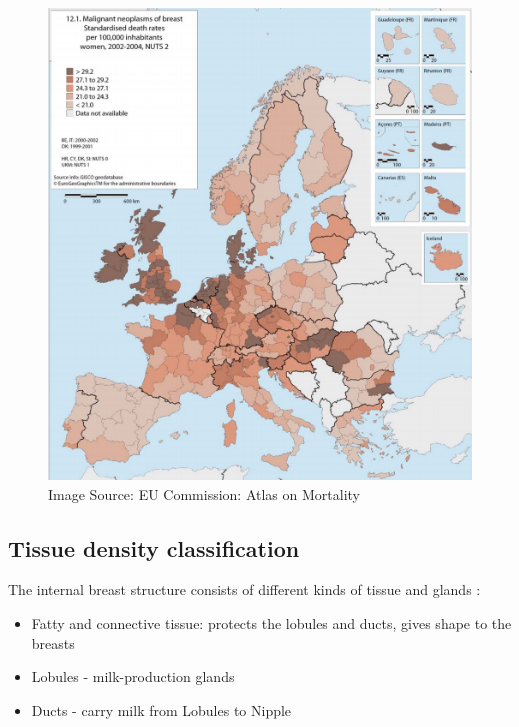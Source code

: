 \begin{figure}[!h]
  \center
  \includegraphics[scale=0.5]{Chapter1/background-img/mortality_EU_Comms.png}
  \caption{Image Source: EU Commission: Atlas on Mortality \cite{European_Commission_2009}}
  \label{fig:mortality-band}
\end{figure}

\subsection{Tissue density classification}

The internal breast structure consists of different kinds of tissue and glands \cite{Anatomy_breast}:

\begin{itemize}
  \item Fatty and connective tissue: protects the lobules and ducts, gives shape to the breasts
  \item Lobules - milk-production glands
  \item Ducts - carry milk from Lobules to Nipple
\end{itemize}

